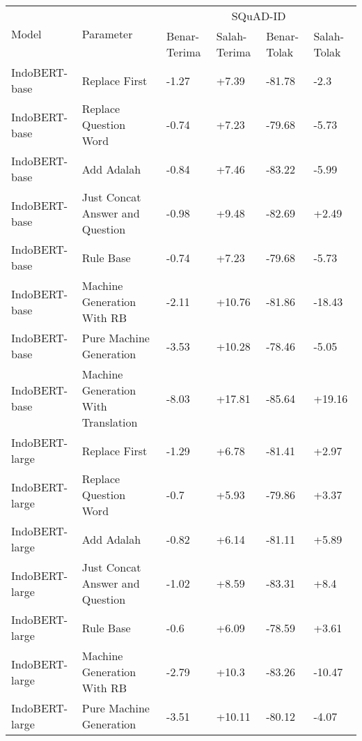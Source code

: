 \begin{table}[H]\centering
\scriptsize
\begin{tabular}{llllll}
\toprule
         \multirow{2}{*}{Model} &\multirow{2}{*}{Parameter} &\multicolumn{4}{c}{SQuAD-ID} \\\cmidrule{3-6}
& &Benar-Terima &Salah-Terima &Benar-Tolak &Salah-Tolak \\\midrule
 IndoBERT-base &                       Replace First &        -1.27 &        +7.39 &      -81.78 &        -2.3 \\
 IndoBERT-base &               Replace Question Word &        -0.74 &        +7.23 &      -79.68 &       -5.73 \\
 IndoBERT-base &                          Add Adalah &        -0.84 &        +7.46 &      -83.22 &       -5.99 \\
 IndoBERT-base &     Just Concat Answer and Question &        -0.98 &        +9.48 &      -82.69 &       +2.49 \\
 IndoBERT-base &                           Rule Base &        -0.74 &        +7.23 &      -79.68 &       -5.73 \\
 IndoBERT-base &          Machine Generation With RB &        -2.11 &       +10.76 &      -81.86 &      -18.43 \\
 IndoBERT-base &             Pure Machine Generation &        -3.53 &       +10.28 &      -78.46 &       -5.05 \\
 IndoBERT-base & Machine Generation With Translation &        -8.03 &       +17.81 &      -85.64 &      +19.16 \\
\hline
IndoBERT-large &                       Replace First &        -1.29 &        +6.78 &      -81.41 &       +2.97 \\
IndoBERT-large &               Replace Question Word &         -0.7 &        +5.93 &      -79.86 &       +3.37 \\
IndoBERT-large &                          Add Adalah &        -0.82 &        +6.14 &      -81.11 &       +5.89 \\
IndoBERT-large &     Just Concat Answer and Question &        -1.02 &        +8.59 &      -83.31 &        +8.4 \\
IndoBERT-large &                           Rule Base &         -0.6 &        +6.09 &      -78.59 &       +3.61 \\
IndoBERT-large &          Machine Generation With RB &        -2.79 &        +10.3 &      -83.26 &      -10.47 \\
IndoBERT-large &             Pure Machine Generation &        -3.51 &       +10.11 &      -80.12 &       -4.07 \\

\end{tabular}
\end{table}
